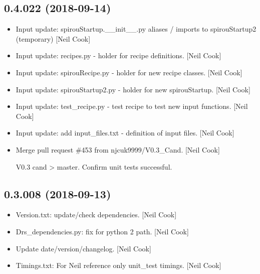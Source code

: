 \documentclass[a4paper,10pt,english]{report}
\begin{document}
\subsection{0.4.022 (2018-09-14)}
\label{\detokenize{misc/changelog:id323}}\begin{itemize}
\item {} 
Input update: spirouStartup.\_\_init\_\_.py aliases / imports to
spirouStartup2 (temporary) {[}Neil Cook{]}

\item {} 
Input update: recipes.py - holder for recipe definitions. {[}Neil Cook{]}

\item {} 
Input update: spirouRecipe.py - holder for new recipe classes. {[}Neil
Cook{]}

\item {} 
Input update: spirouStartup2.py - holder for new spirouStartup. {[}Neil
Cook{]}

\item {} 
Input update: test\_recipe.py - test recipe to test new input
functions. {[}Neil Cook{]}

\item {} 
Input update: add input\_files.txt - definition of input files. {[}Neil
Cook{]}

\item {} 
Merge pull request \#453 from njcuk9999/V0.3\_Cand. {[}Neil Cook{]}

V0.3 cand \textendash{}\textgreater{} master. Confirm unit tests successful.

\end{itemize}


\subsection{0.3.008 (2018-09-13)}
\label{\detokenize{misc/changelog:id324}}\begin{itemize}
\item {} 
Version.txt: update/check dependencies. {[}Neil Cook{]}

\item {} 
Drs\_dependencies.py: fix for python 2 path. {[}Neil Cook{]}

\item {} 
Update date/version/changelog. {[}Neil Cook{]}

\item {} 
Timings.txt: For Neil reference only unit\_test timings. {[}Neil Cook{]}

\end{itemize}
\end{document}
